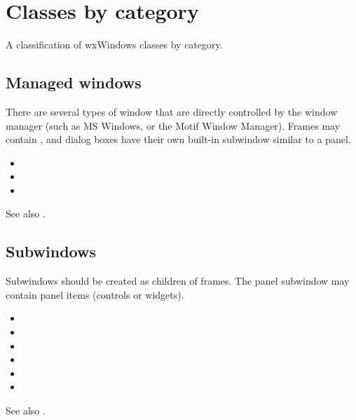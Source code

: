 \chapter{Classes by category}\label{classesbycat}
%
\setfooter{\thepage}{}{}{}{}{\thepage}%

A classification of wxWindows classes by category.

\section{Managed windows}

There are several types of window that are directly controlled by the
window manager (such as MS Windows, or the Motif Window Manager).
Frames may contain , and
dialog boxes have their own built-in subwindow similar to a panel.

\begin{itemize}\itemsep=0pt
\item {}
\item {}
\item {}
\end{itemize}

See also .

\section{Subwindows}\label{catsubwindows}

Subwindows should be created as children of frames. The panel
subwindow may contain panel items (controls or widgets).

\begin{itemize}\itemsep=0pt
\item {}
\item {}
\item {}
\item {}
\item {}
\item {}
\end{itemize}

See also .

